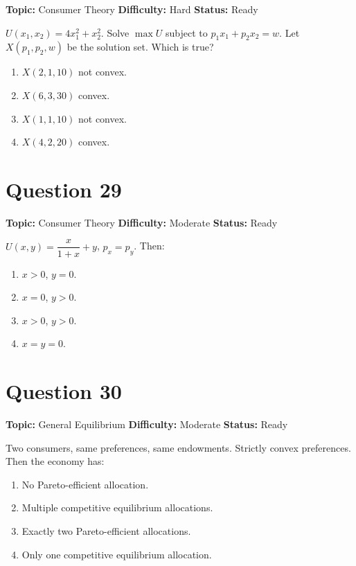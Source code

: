 \documentclass[11pt]{article}
\begin{document}

\noindent\textbf{Topic:} Consumer Theory \quad \textbf{Difficulty:} Hard \quad \textbf{Status:} Ready



$U(x_1,x_2) = 4 x_1^2 + x_2^2$. Solve $\max U$ subject to $p_1 x_1 + p_2 x_2 = w$. Let $X(p_1, p_2, w)$ be the solution set. Which is true?

\begin{enumerate}[label=(\Alph*)]
\item $X(2,1,10)$ not convex.
\item $X(6,3,30)$ convex.
\item $X(1,1,10)$ not convex.
\item $X(4,2,20)$ convex.
\end{enumerate}

\newpage

\section*{Question 29}


\noindent\textbf{Topic:} Consumer Theory \quad \textbf{Difficulty:} Moderate \quad \textbf{Status:} Ready



$U(x,y) = \dfrac{x}{1+x} + y$, $p_x = p_y$. Then:

\begin{enumerate}[label=(\Alph*)]
\item $x > 0$, $y = 0$.
\item $x = 0$, $y > 0$.
\item $x > 0$, $y > 0$.
\item $x = y = 0$.
\end{enumerate}

\newpage

\section*{Question 30}


\noindent\textbf{Topic:} General Equilibrium \quad \textbf{Difficulty:} Moderate \quad \textbf{Status:} Ready



Two consumers, same preferences, same endowments. Strictly convex preferences. Then the economy has:
\begin{enumerate}[label=(\Alph*)]
\item No Pareto-efficient allocation.
\item Multiple competitive equilibrium allocations.
\item Exactly two Pareto-efficient allocations.
\item Only one competitive equilibrium allocation.
\end{enumerate}
\end{document}
